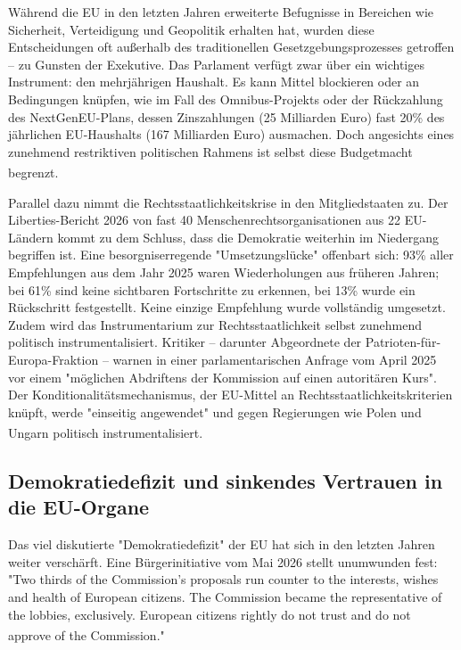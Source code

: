 \documentclass[12pt,a4paper]{article}
\newcommand{\footcite}[1]{\textsuperscript{\cite{#1}}}
\begin{document}
	Während die EU in den letzten Jahren erweiterte Befugnisse in Bereichen wie Sicherheit, Verteidigung und Geopolitik erhalten hat, wurden diese Entscheidungen oft außerhalb des traditionellen Gesetzgebungsprozesses getroffen – zu Gunsten der Exekutive. Das Parlament verfügt zwar über ein wichtiges Instrument: den mehrjährigen Haushalt. Es kann Mittel blockieren oder an Bedingungen knüpfen, wie im Fall des Omnibus-Projekts oder der Rückzahlung des NextGenEU-Plans, dessen Zinszahlungen (25 Milliarden Euro) fast 20\% des jährlichen EU-Haushalts (167 Milliarden Euro) ausmachen. Doch angesichts eines zunehmend restriktiven politischen Rahmens ist selbst diese Budgetmacht begrenzt.\footcite{Delors2025}
	
	Parallel dazu nimmt die Rechtsstaatlichkeitskrise in den Mitgliedstaaten zu. Der Liberties-Bericht 2026 von fast 40 Menschenrechtsorganisationen aus 22 EU-Ländern kommt zu dem Schluss, dass die Demokratie weiterhin im Niedergang begriffen ist. Eine besorgniserregende "Umsetzungslücke" offenbart sich: 93\% aller Empfehlungen aus dem Jahr 2025 waren Wiederholungen aus früheren Jahren; bei 61\% sind keine sichtbaren Fortschritte zu erkennen, bei 13\% wurde ein Rückschritt festgestellt. Keine einzige Empfehlung wurde vollständig umgesetzt. Zudem wird das Instrumentarium zur Rechtsstaatlichkeit selbst zunehmend politisch instrumentalisiert. Kritiker – darunter Abgeordnete der Patrioten-für-Europa-Fraktion – warnen in einer parlamentarischen Anfrage vom April 2025 vor einem "möglichen Abdriftens der Kommission auf einen autoritären Kurs". Der Konditionalitätsmechanismus, der EU-Mittel an Rechtsstaatlichkeitskriterien knüpft, werde "einseitig angewendet" und gegen Regierungen wie Polen und Ungarn politisch instrumentalisiert.\footcite{Liberties2026}\footcite{Furet2025}
	
	\subsection{Demokratiedefizit und sinkendes Vertrauen in die EU-Organe}
	
	Das viel diskutierte "Demokratiedefizit" der EU hat sich in den letzten Jahren weiter verschärft. Eine Bürgerinitiative vom Mai 2026 stellt unumwunden fest: "Two thirds of the Commission's proposals run counter to the interests, wishes and health of European citizens. The Commission became the representative of the lobbies, exclusively. European citizens rightly do not trust and do not approve of the Commission."\footcite{Citizen2026}
	
\end{document}
